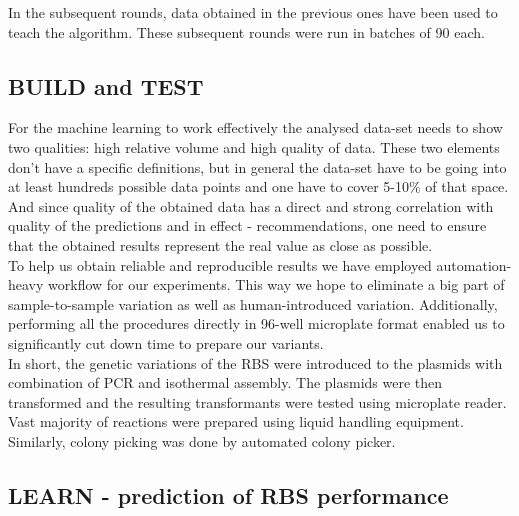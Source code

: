\documentclass{article}
\begin{document}
In the subsequent rounds, data obtained in the previous ones have been used to teach the algorithm. 
These subsequent rounds were run in batches of 90 each. \\

\subsection{BUILD and TEST}

For the machine learning to work effectively the analysed data-set needs to show two qualities: high relative volume and high quality of data.
These two elements don't have a specific definitions, but in general the data-set have to be going into at least hundreds possible data points and one have to cover 5-10\% of that space.
And since quality of the obtained data has a direct and strong correlation with quality of the predictions and in effect - recommendations, one need to ensure that the obtained results represent the real value as close as possible.\\
To help us obtain reliable and reproducible results we have employed automation-heavy workflow for our experiments.
This way we hope to eliminate a big part of sample-to-sample variation as well as human-introduced variation.
Additionally, performing all the procedures directly in 96-well microplate format enabled us to significantly cut down time to prepare our variants.\\
In short, the genetic variations of the RBS were introduced to the plasmids with combination of PCR and isothermal assembly. 
The plasmids were then transformed and the resulting transformants were tested using microplate reader.
Vast majority of reactions were prepared using liquid handling equipment.
Similarly, colony picking was done by automated colony picker.\\

\subsection{LEARN - prediction of RBS performance}
\end{document}
